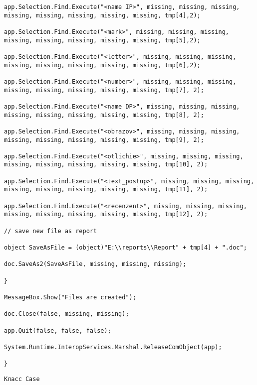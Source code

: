 \begin{lstlisting}
app.Selection.Find.Execute("<name IP>", missing, missing, missing, missing, missing, missing, missing, missing, tmp[4],2);

app.Selection.Find.Execute("<mark>", missing, missing, missing, missing, missing, missing, missing, missing, tmp[5],2);

app.Selection.Find.Execute("<letter>", missing, missing, missing, missing, missing, missing, missing, missing, tmp[6],2);

app.Selection.Find.Execute("<number>", missing, missing, missing, missing, missing, missing, missing, missing, tmp[7], 2);

app.Selection.Find.Execute("<name DP>", missing, missing, missing, missing, missing, missing, missing, missing, tmp[8], 2);

app.Selection.Find.Execute("<obrazov>", missing, missing, missing, missing, missing, missing, missing, missing, tmp[9], 2);

app.Selection.Find.Execute("<otlichie>", missing, missing, missing, missing, missing, missing, missing, missing, tmp[10], 2);

app.Selection.Find.Execute("<text_postup>", missing, missing, missing, missing, missing, missing, missing, missing, tmp[11], 2);

app.Selection.Find.Execute("<recenzent>", missing, missing, missing, missing, missing, missing, missing, missing, tmp[12], 2);

// save new file as report

object SaveAsFile = (object)"E:\\reports\\Report" + tmp[4] + ".doc";

doc.SaveAs2(SaveAsFile, missing, missing, missing);

}

MessageBox.Show("Files are created");

doc.Close(false, missing, missing);

app.Quit(false, false, false);

System.Runtime.InteropServices.Marshal.ReleaseComObject(app);

} 
\end{lstlisting}


\begin{verbatim}
Класс Case
\end{verbatim}

